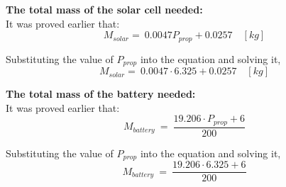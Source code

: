 \p \textbf{The total mass of the solar cell needed:} \vspace{0.1cm}\\
It was proved earlier that:
\[
M_{solar} = \ 0.0047 P_{prop} + 0.0257  \quad [kg]
\]

Substituting the value of $ P_{prop} $ into the equation and solving it, \[ M_{solar} = \ 0.0047 \cdot 6.325 + 0.0257  \quad [kg] \] \begin{center}  \end{center} \vspace{1cm}

\p \textbf{The total mass of the battery needed:} \vspace{0.1cm}\\
It was proved earlier that:
\[
M_{battery} \ = \ \frac{ 19.206 \cdot P_{prop} + 6 }{ 200 }
\]

Substituting the value of $ P_{prop} $ into the equation and solving it,
\[
M_{battery} \ = \ \frac{ 19.206 \cdot 6.325 + 6 }{ 200 }
\]
\begin{center}
\end{center}
